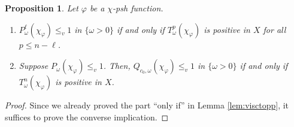 \documentclass[10pt,a4paper]{amsart}
\numberwithin{equation}{section}
\newtheorem{prop}[equation]{Proposition}
\begin{document}
\begin{prop}\label{prop:viscpp}
    Let $\varphi$ be a $\chi$-psh function.
    \begin{enumerate}[label={\upshape(\roman*)}]
        \item\label{item:posin-1} 
        $P^\ell_{\omega}(\chi_\varphi)\le_v 1$ in $\{\omega>0\}$ if and only if $T^p_\omega(\chi_\varphi)$ is positive in $X$ for all $p\le n-\ell$.
        \item\label{item:posin} 
        Suppose $P_{\omega}(\chi_\varphi)\le_v 1$. Then, $Q_{c_0,\omega}(\chi_\varphi)\le_v 1$ in $\{\omega>0\}$ if and only if $T^n_\omega(\chi_\varphi)$ is positive in $X$.
    \end{enumerate}
\end{prop}

\begin{proof}
    Since we already proved the part ``only if'' in Lemma \ref{lem:visctopp}, it suffices to prove the converse implication.
    

\end{proof}
\end{document}
